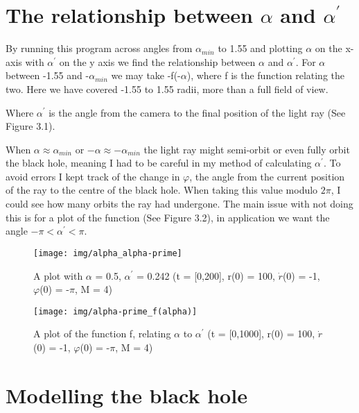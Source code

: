 \documentclass[oneside,openright,frontopenright]{dmathesis}
\begin{document}
\section{The relationship between $\alpha$ and $\alpha^{'}$}

	By running this program across angles from $\alpha_{min}$ to 1.55 and plotting $\alpha$ on the x-axis with $\alpha^{'}$ on the y axis we find the relationship between $\alpha$ and $\alpha^{'}$. For $\alpha$ between -1.55 and -$\alpha_{min}$ we may take -f(-$\alpha$), where f is the function relating the two. Here we have covered -1.55 to 1.55 radii, more than a full field of view.

	Where  $\alpha^{'}$ is the angle from the camera to the final position of the light ray (See Figure 3.1).

	When $\alpha \approx \alpha_{min}$ or $-\alpha \approx -\alpha_{min}$ the light ray might semi-orbit or even fully orbit the black hole, meaning I had to be careful in my method  of calculating $\alpha^{'}$. To avoid errors I kept track of the change in $\varphi$, the angle from the current position of the ray to the centre of the black hole. When taking this value modulo $2\pi$, I could see how many orbits the ray had undergone. The main issue with not doing this is for a plot of the function (See Figure 3.2), in application we want the angle $-\pi<\alpha^{'}<\pi$.

\begin{figure}
	\centering
	\begin{minipage}{0.5\textwidth}
		\centering
		\texttt{[image: img/alpha\_alpha-prime]}
		\caption{A plot with $\alpha$ = 0.5, $\alpha^{'}$ = 0.242 (t = [0,200], r(0) = 100, $\dot{r}$(0) = -1, $\varphi$(0) = -$\pi$, M = 4)}
	\end{minipage}%
	\hfill
	\begin{minipage}{0.5\textwidth}
		\centering
		\texttt{[image: img/alpha-prime\_f(alpha)]}
		\caption{A plot of the function f, relating $\alpha$ to $\alpha^{'}$ (t = [0,1000], r(0) = 100, $\dot{r}$(0) = -1, $\varphi$(0) = -$\pi$, M = 4)}
	\end{minipage}
\end{figure}

\section{Modelling the black hole}
	
\end{document}
